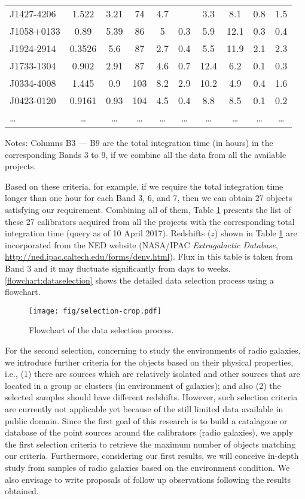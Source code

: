 \begin{table}
\begin{tabular}{lccccccccc}
J1427-4206	&	1.522			&	3.21	&	74	&	4.7	&		&	3.3	&	8.1	&	0.8	&	1.5	\\
J1058+0133	&	0.89			&	5.39	&	86	&	5	&	0.3	&	5.9	&	12.1	&	0.3	&	0.4	\\
J1924-2914	&	0.3526			&	5.6	&	87	&	2.7	&	0.4	&	5.5	&	11.9	&	2.1	&	2.3	\\
J1733-1304	&	0.902			&	2.91	&	87	&	4.6	&	0.7	&	12.4	&	6.2	&	0.1	&	0.3	\\
J0334-4008	&	1.445			&	0.9	&	103	&	8.2	&	2.9	&	10.2	&	4.9	&	0.4	&	1.6	\\
J0423-0120	&	0.9161			&	0.93	&	104	&	4.5	&	0.4	&	8.8	&	8.5	&	0.1	&	0.2	\\
\ldots	&	\ldots			&	\ldots	&	\ldots	&	\ldots	&	\ldots	&	\ldots	&	\ldots	&	\ldots	&	\ldots	\\
\hline
\end{tabular}
\label{tab:selectedcalibrator}
\noindent Notes: Columns B3 --- B9 are the total integration time (in hours) in the corresponding Bands 3 to 9, 
if we combine all the data from all the available projects. 
\end{table}

Based on these criteria, for example, if we require the total integration time longer than one hour for each Band 3, 6, 
and 7, then we can obtain 27 objects satisfying our requirement. Combining all of them, Table \ref{tab:selectedcalibrator}
presents the list of these 27 calibrators acquired from all the projects with the corresponding total integration time
(query as of 10 April 2017).
Redshifts ($z$) shown in Table \ref{tab:selectedcalibrator} are incorporated from  the NED website (NASA/IPAC {\it Extragalactic Database}, 
\url{http://ned.ipac.caltech.edu/forms/denv.html}). Flux in this table is taken from Band 3 and it may fluctuate significantly 
from days to weeks. \autoref{flowchart:dataselection} shows the detailed data selection process using a flowchart.

\begin{figure}[ht]
\centering
\texttt{[image: fig/selection-crop.pdf]}
\caption{Flowchart of the data selection process.}
\label{flowchart:dataselection}
\end{figure}

For the second selection, concerning to study the environments of radio galaxies, we introduce further criteria 
for the objects based on their physical properties, i.e., (1) 
there are sources which are relatively isolated and other sources that are located in a group or clusters (in environment
of galaxies); and also (2) the selected samples should have different redshifts. However, such selection criteria are currently not 
applicable yet because of the still limited data available in public domain. 
Since the first goal of this research is to build a catalagoue or database of the point 
sources around the calibrators (radio galaxies), we apply the first selection criteria to retrieve the maximum number of
objects matching our criteria.  
Furthermore, considering our first results, we will conceive in-depth study from samples of radio galaxies based on 
the environment condition. We also envisage to write proposals of follow up observations following the results obtained.

